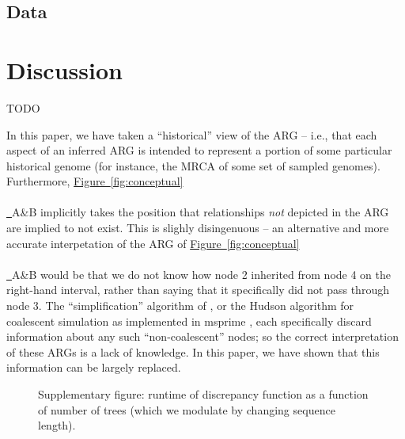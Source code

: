 \documentclass[10pt,twoside,lineno]{gsajnl}
\newcommand*{\figref}[2][]{%
	\hyperref[{#2}]{%
		Figure~\ref*{#2}%
		\ifx\\#1\\%
		\else
		\,#1%
		\fi
	}%
}
\begin{document}
\subsection{Data}



\section{Discussion}

TODO

In this paper, we have taken a ``historical'' view of the ARG --
i.e., that each aspect of an inferred ARG is intended to represent
a portion of some particular historical genome
(for instance, the MRCA of some set of sampled genomes).
Furthermore, \figref{fig:conceptual}A\&B implicitly takes the position
that relationships \emph{not} depicted in the ARG are implied to not exist.
This is slighly disingenuous -- an alternative and more accurate interpetation
of the ARG of \figref{fig:conceptual}A\&B would be that we do not know
how node 2 inherited from node 4 on the right-hand interval,
rather than saying that it specifically did not pass through node 3.
The ``simplification'' algorithm of \citet{kelleher2018efficient},
or the Hudson algorithm for coalescent simulation
as implemented in msprime \citep{kelleher2016efficient},
each specifically discard information about any such ``non-coalescent'' nodes;
so the correct interpretation of these ARGs is a lack of knowledge.
In this paper, we have shown that this information can be largely replaced.




\appendix

\begin{figure}
    \caption{
        Supplementary figure: runtime of discrepancy function as a function of number of trees
        (which we modulate by changing sequence length).
        \label{fig:speed_discrepancy}
    }
\end{figure}
\end{document}
